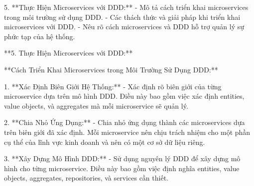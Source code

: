 
% 
% 
% 
% 
% 
% 
% 
% 
% 
% 
% 


 



5. **Thực Hiện Microservices với DDD:**
   - Mô tả cách triển khai microservices trong môi trường sử dụng DDD.
   - Các thách thức và giải pháp khi triển khai microservices với DDD.
   - Nêu rõ cách microservices và DDD hỗ trợ quản lý sự phức tạp của hệ thống.






**5. Thực Hiện Microservices với DDD:**

**Cách Triển Khai Microservices trong Môi Trường Sử Dụng DDD:**

1. **Xác Định Biên Giới Hệ Thống:**
   - Xác định rõ biên giới của từng microservice dựa trên mô hình DDD. Điều này bao gồm việc xác định entities, value objects, và aggregates mà mỗi microservice sẽ quản lý.

2. **Chia Nhỏ Ứng Dụng:**
   - Chia nhỏ ứng dụng thành các microservices dựa trên biên giới đã xác định. Mỗi microservice nên chịu trách nhiệm cho một phần cụ thể của lĩnh vực kinh doanh và nên có một cơ sở dữ liệu riêng.

3. **Xây Dựng Mô Hình DDD:**
   - Sử dụng nguyên lý DDD để xây dựng mô hình cho từng microservice. Điều này bao gồm việc định nghĩa entities, value objects, aggregates, repositories, và services cần thiết.

